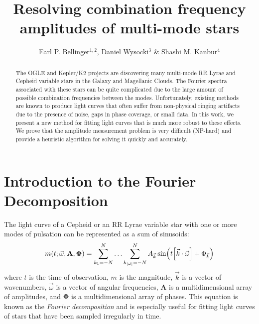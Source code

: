 \documentclass[11pt,twoside]{book}
\begin{document}
\pagestyle{myheadings}
\setcounter{equation}{0}\setcounter{figure}{0}\setcounter{footnote}{0}\setcounter{section}{0}\setcounter{table}{0}\setcounter{page}{1}
\title{Resolving combination frequency amplitudes of multi-mode stars}
\author{Earl P. Bellinger$^{1,2}$, Daniel Wysocki$^3$ \& Shashi M. Kanbur$^4$}

\begin{abstract}
The OGLE and Kepler/K2 projects are discovering many multi-mode RR Lyrae and Cepheid variable stars in the Galaxy and Magellanic Clouds. The Fourier spectra associated with these stars can be quite complicated due to the large amount of possible combination frequencies between the modes. Unfortunately, existing methods are known to produce light curves that often suffer from non-physical ringing artifacts due to the presence of noise, gaps in phase coverage, or small data. In this work, we present a new method for fitting light curves that is much more robust to these effects. We prove that the amplitude measurement problem is very difficult (NP-hard) and provide a heuristic algorithm for solving it quickly and accurately. 
\end{abstract}

\section{Introduction to the Fourier Decomposition}
The light curve of a Cepheid or an RR Lyrae variable star with one or more modes of pulsation can be represented as a sum of sinusoids:
\begin{equation}
    m(t ; \vec \omega, \mathbf A, \boldsymbol \Phi) = \sum_{k_1={-N}}^N \ldots \sum_{k_{|\vec \omega|}={-N}}^N A_{\vec k} \sin(t\qty[\vec k\cdot \vec \omega] + \Phi_{\vec k})
\end{equation}
where $t$ is the time of observation, $m$ is the magnitude, $\vec k$ is a vector of wavenumbers, $\vec \omega$ is a vector of angular frequencies, $\mathbf A$ is a multidimensional array of amplitudes, and $\boldsymbol \Phi$ is a multidimensional array of phases. This equation is known as the \emph{Fourier decomposition} and is especially useful for fitting light curves of stars that have been sampled irregularly in time. 
\end{document}
